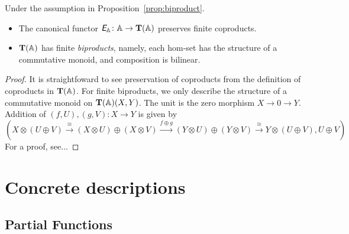 \begin{corollary}\label{cor:biproduct}
  Under the assumption in Proposition~\ref{prop:biproduct}.
  \begin{itemize}
  \item The canonical functor $\textit{\textsf{E}}_{\mathbb{A}} \colon \mathbb{A} \to \mathbf T(\mathbb{A})$ preserves
    finite coproducts.
  \item $\mathbf T(\mathbb{A})$ has finite \emph{biproducts}, namely, each hom-set has the structure
    of a commutative monoid, and composition is bilinear.
  \end{itemize}
\end{corollary}
\begin{proof}
  It is straightfoward to see preservation of coproducts from the definition
  of coproducts in $\mathbf T(\mathbb{A})$. For finite biproducts, we only describe the
  structure of a commutative monoid on $\mathbf T(\mathbb{A})(X,Y)$. The unit is the zero
  morphism $X \longrightarrow 0 \longrightarrow Y$. Addition of $(f,U),(g,V)
  \colon X \to Y$ is given by
  \begin{equation*}
    (X \otimes (U \oplus V) \xrightarrow{\cong}
    (X \otimes U) \oplus (X \otimes V) \xrightarrow{f \oplus g}
    (Y \otimes U) \oplus (Y \otimes V) \xrightarrow{\cong}
    Y \otimes (U \oplus V), U \oplus V 
    )
  \end{equation*}
  For a proof, see...
\end{proof}

\section{Concrete descriptions}

\subsection{Partial Functions}


